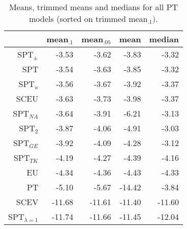 \begin{table}[!htb]
\centering
\begin{tabular}{rrrrr}
  \hline
 & mean$_{.1}$ & mean$_{.05}$ & mean & median \\ 
  \hline
SPT$_{\pm}$ & -3.53 & -3.62 & -3.83 & -3.32 \\ 
  SPT & -3.54 & -3.63 & -3.85 & -3.32 \\ 
  SPT$_{u}$ & -3.56 & -3.67 & -3.92 & -3.37 \\ 
  SCEU & -3.63 & -3.73 & -3.98 & -3.37 \\ 
  SPT$_{NA}$ & -3.64 & -3.91 & -6.21 & -3.13 \\ 
  SPT$_{2}$ & -3.87 & -4.06 & -4.91 & -3.03 \\ 
  SPT$_{GE}$ & -3.92 & -4.09 & -4.28 & -3.12 \\ 
  SPT$_{TK}$ & -4.19 & -4.27 & -4.39 & -4.16 \\ 
  EU & -4.34 & -4.36 & -4.43 & -4.33 \\ 
  PT & -5.10 & -5.67 & -14.42 & -3.84 \\ 
  SCEV & -11.68 & -11.61 & -11.40 & -11.60 \\ 
  SPT$_{\lambda = 1}$ & -11.74 & -11.66 & -11.45 & -12.04 \\ 
   \hline
\end{tabular}
\caption{Means, trimmed means and medians for all PT models (sorted on trimmed mean$_{.1})$.} 
\label{table_means_PT_models}
\end{table}
